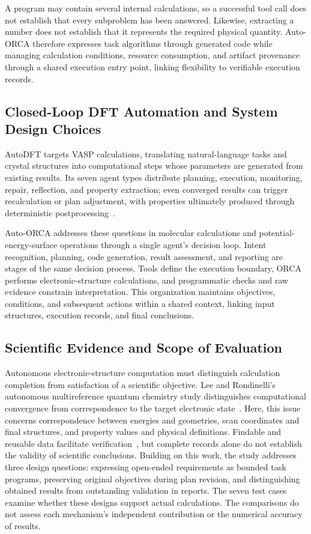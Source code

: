 \documentclass[a4paper,11pt]{article}
\begin{document}
A program may contain several internal calculations, so a successful tool call does not establish that every subproblem has been answered.
Likewise, extracting a number does not establish that it represents the required physical quantity.
Auto-ORCA therefore expresses task algorithms through generated code while managing calculation conditions, resource consumption, and artifact provenance through a shared execution entry point, linking flexibility to verifiable execution records.

\subsection{Closed-Loop DFT Automation and System Design Choices}
AutoDFT targets VASP calculations, translating natural-language tasks and crystal structures into computational steps whose parameters are generated from existing results.
Its seven agent types distribute planning, execution, monitoring, repair, reflection, and property extraction; even converged results can trigger recalculation or plan adjustment, with properties ultimately produced through deterministic postprocessing~\cite{autodft}.

Auto-ORCA addresses these questions in molecular calculations and potential-energy-surface operations through a single agent's decision loop.
Intent recognition, planning, code generation, result assessment, and reporting are stages of the same decision process.
Tools define the execution boundary, ORCA performs electronic-structure calculations, and programmatic checks and raw evidence constrain interpretation.
This organization maintains objectives, conditions, and subsequent actions within a shared context, linking input structures, execution records, and final conclusions.

\subsection{Scientific Evidence and Scope of Evaluation}
Autonomous electronic-structure computation must distinguish calculation completion from satisfaction of a scientific objective.
Lee and Rondinelli's autonomous multireference quantum chemistry study distinguishes computational convergence from correspondence to the target electronic state~\cite{multirefagent}.
Here, this issue concerns correspondence between energies and geometries, scan coordinates and final structures, and property values and physical definitions.
Findable and reusable data facilitate verification~\cite{fair}, but complete records alone do not establish the validity of scientific conclusions.
Building on this work, the study addresses three design questions: expressing open-ended requirements as bounded task programs, preserving original objectives during plan revision, and distinguishing obtained results from outstanding validation in reports.
The seven test cases examine whether these designs support actual calculations.
The comparisons do not assess each mechanism's independent contribution or the numerical accuracy of results.
\end{document}
